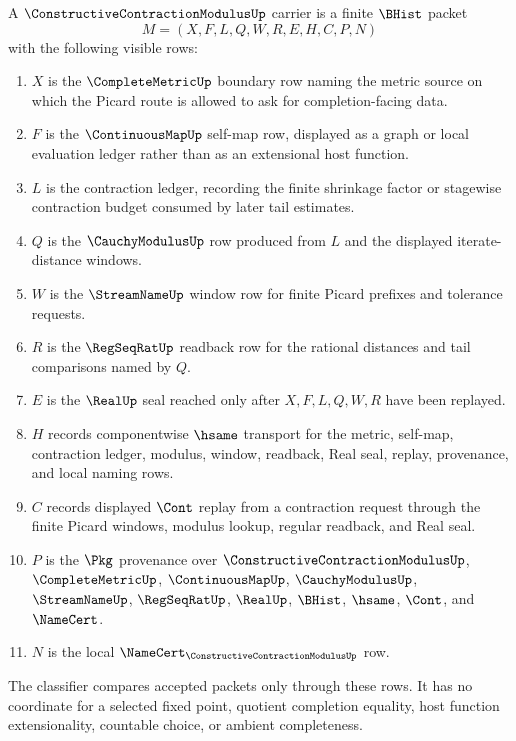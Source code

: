 \begin{definition}
\label{def:constructive-contraction-modulus-carrier}
A $\ConstructiveContractionModulusUp$ carrier is a finite $\BHist$ packet
$$
M=(X,F,L,Q,W,R,E,H,C,P,N)
$$
with the following visible rows:
\begin{enumerate}
\item $X$ is the $\CompleteMetricUp$ boundary row naming the metric source on which the Picard route is allowed to ask for completion-facing data.
\item $F$ is the $\ContinuousMapUp$ self-map row, displayed as a graph or local evaluation ledger rather than as an extensional host function.
\item $L$ is the contraction ledger, recording the finite shrinkage factor or stagewise contraction budget consumed by later tail estimates.
\item $Q$ is the $\CauchyModulusUp$ row produced from $L$ and the displayed iterate-distance windows.
\item $W$ is the $\StreamNameUp$ window row for finite Picard prefixes and tolerance requests.
\item $R$ is the $\RegSeqRatUp$ readback row for the rational distances and tail comparisons named by $Q$.
\item $E$ is the $\RealUp$ seal reached only after $X,F,L,Q,W,R$ have been replayed.
\item $H$ records componentwise $\hsame$ transport for the metric, self-map, contraction ledger, modulus, window, readback, Real seal, replay, provenance, and local naming rows.
\item $C$ records displayed $\Cont$ replay from a contraction request through the finite Picard windows, modulus lookup, regular readback, and Real seal.
\item $P$ is the $\Pkg$ provenance over $\ConstructiveContractionModulusUp$, $\CompleteMetricUp$, $\ContinuousMapUp$, $\CauchyModulusUp$, $\StreamNameUp$, $\RegSeqRatUp$, $\RealUp$, $\BHist$, $\hsame$, $\Cont$, and $\NameCert$.
\item $N$ is the local $\NameCert_{\ConstructiveContractionModulusUp}$ row.
\end{enumerate}
The classifier compares accepted packets only through these rows. It has no coordinate for a selected fixed point, quotient completion equality, host function extensionality, countable choice, or ambient completeness.
\end{definition}

